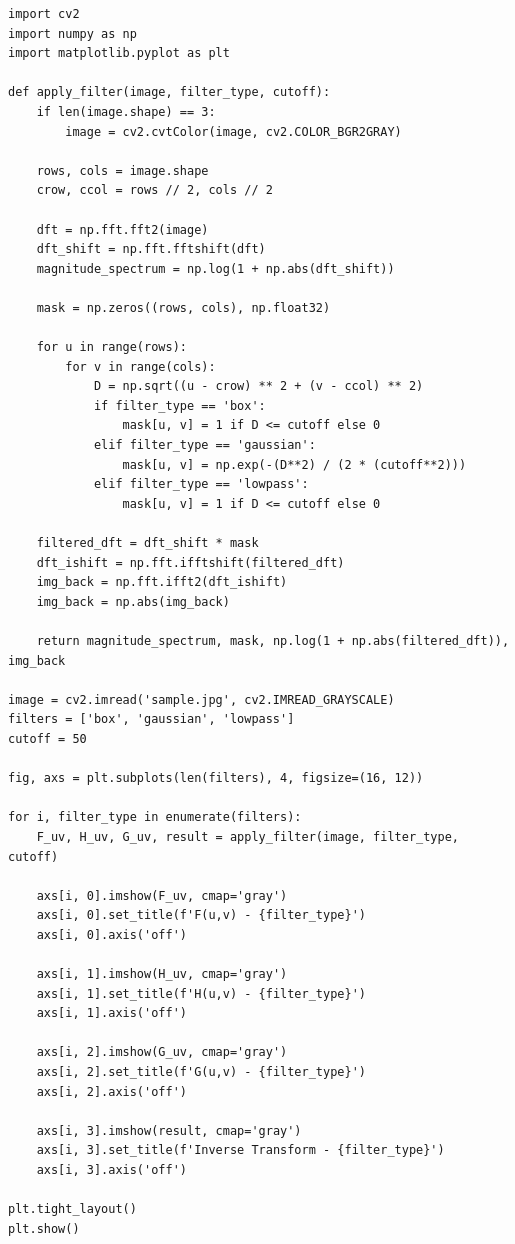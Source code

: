\documentclass{report}
\begin{document}
\begin{lstlisting}
import cv2
import numpy as np
import matplotlib.pyplot as plt

def apply_filter(image, filter_type, cutoff):
    if len(image.shape) == 3:
        image = cv2.cvtColor(image, cv2.COLOR_BGR2GRAY)

    rows, cols = image.shape
    crow, ccol = rows // 2, cols // 2

    dft = np.fft.fft2(image)
    dft_shift = np.fft.fftshift(dft)
    magnitude_spectrum = np.log(1 + np.abs(dft_shift))

    mask = np.zeros((rows, cols), np.float32)
    
    for u in range(rows):
        for v in range(cols):
            D = np.sqrt((u - crow) ** 2 + (v - ccol) ** 2)
            if filter_type == 'box':
                mask[u, v] = 1 if D <= cutoff else 0
            elif filter_type == 'gaussian':
                mask[u, v] = np.exp(-(D**2) / (2 * (cutoff**2)))
            elif filter_type == 'lowpass':
                mask[u, v] = 1 if D <= cutoff else 0
    
    filtered_dft = dft_shift * mask
    dft_ishift = np.fft.ifftshift(filtered_dft)
    img_back = np.fft.ifft2(dft_ishift)
    img_back = np.abs(img_back)
    
    return magnitude_spectrum, mask, np.log(1 + np.abs(filtered_dft)), img_back

image = cv2.imread('sample.jpg', cv2.IMREAD_GRAYSCALE)
filters = ['box', 'gaussian', 'lowpass']
cutoff = 50

fig, axs = plt.subplots(len(filters), 4, figsize=(16, 12))

for i, filter_type in enumerate(filters):
    F_uv, H_uv, G_uv, result = apply_filter(image, filter_type, cutoff)

    axs[i, 0].imshow(F_uv, cmap='gray')
    axs[i, 0].set_title(f'F(u,v) - {filter_type}')
    axs[i, 0].axis('off')

    axs[i, 1].imshow(H_uv, cmap='gray')
    axs[i, 1].set_title(f'H(u,v) - {filter_type}')
    axs[i, 1].axis('off')

    axs[i, 2].imshow(G_uv, cmap='gray')
    axs[i, 2].set_title(f'G(u,v) - {filter_type}')
    axs[i, 2].axis('off')

    axs[i, 3].imshow(result, cmap='gray')
    axs[i, 3].set_title(f'Inverse Transform - {filter_type}')
    axs[i, 3].axis('off')

plt.tight_layout()
plt.show()
\end{lstlisting}
\end{document}
